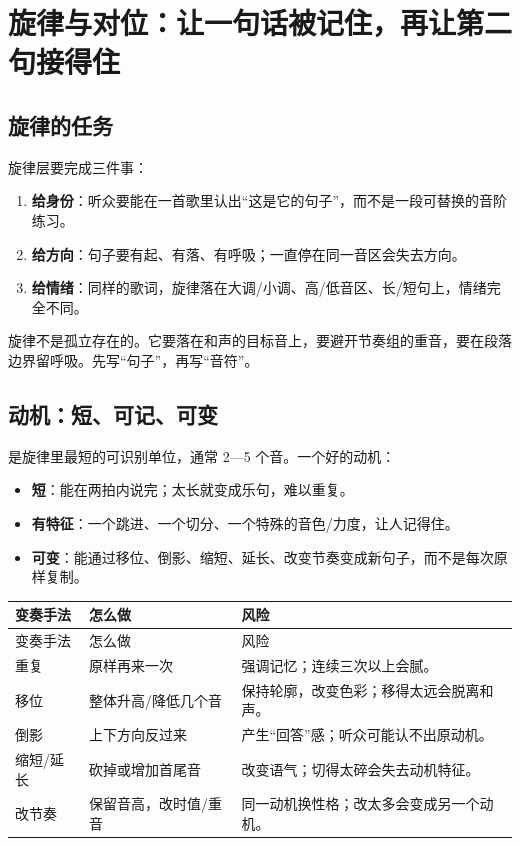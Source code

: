 \chapter{旋律与对位：让一句话被记住，再让第二句接得住}
\label{ch:melody}


\section{旋律的任务}
\label{sec:melody-job}

旋律层要完成三件事：

\begin{enumerate}
\item \textbf{给身份}：听众要能在一首歌里认出“这是它的句子”，而不是一段可替换的音阶练习。
\item \textbf{给方向}：句子要有起、有落、有呼吸；一直停在同一音区会失去方向。
\item \textbf{给情绪}：同样的歌词，旋律落在大调/小调、高/低音区、长/短句上，情绪完全不同。
\end{enumerate}

旋律不是孤立存在的。它要落在和声的目标音上，要避开节奏组的重音，要在段落边界留呼吸。先写“句子”，再写“音符”。

\section{动机：短、可记、可变}
\label{sec:motif}

是旋律里最短的可识别单位，通常 2—5 个音。一个好的动机：

\begin{itemize}
\item \textbf{短}：能在两拍内说完；太长就变成乐句，难以重复。
\item \textbf{有特征}：一个跳进、一个切分、一个特殊的音色/力度，让人记得住。
\item \textbf{可变}：能通过移位、倒影、缩短、延长、改变节奏变成新句子，而不是每次原样复制。
\end{itemize}

\begin{longtable}{p{}p{}p{}}
\toprule
变奏手法 & 怎么做 & 风险 \\
\midrule
\endfirsthead
\toprule
变奏手法 & 怎么做 & 风险 \\
\midrule
\endhead
重复 & 原样再来一次 & 强调记忆；连续三次以上会腻。 \\
移位 & 整体升高/降低几个音 & 保持轮廓，改变色彩；移得太远会脱离和声。 \\
倒影 & 上下方向反过来 & 产生“回答”感；听众可能认不出原动机。 \\
缩短/延长 & 砍掉或增加首尾音 & 改变语气；切得太碎会失去动机特征。 \\
改节奏 & 保留音高，改时值/重音 & 同一动机换性格；改太多会变成另一个动机。 \\
\bottomrule
\end{longtable}

